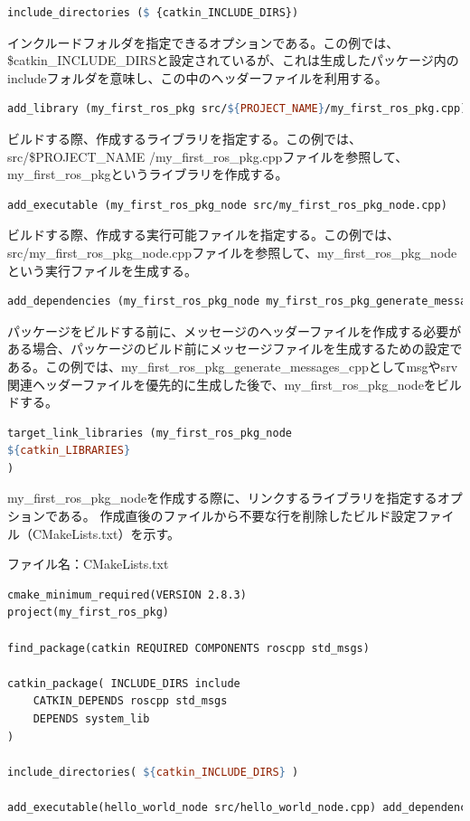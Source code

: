 \begin{lstlisting}[language=make]
include_directories ($ {catkin_INCLUDE_DIRS})
\end{lstlisting}

インクルードフォルダを指定できるオプションである。この例では、\${catkin\_INCLUDE\_DIRS}と設定されているが、これは生成したパッケージ内のincludeフォルダを意味し、この中のヘッダーファイルを利用する。

\begin{lstlisting}[language=make]
add_library (my_first_ros_pkg src/${PROJECT_NAME}/my_first_ros_pkg.cpp)
\end{lstlisting}

ビルドする際、作成するライブラリを指定する。この例では、src/\${PROJECT\_NAME} /my\_first\_ros\_pkg.cppファイルを参照して、my\_first\_ros\_pkgというライブラリを作成する。

\begin{lstlisting}[language=make]
add_executable (my_first_ros_pkg_node src/my_first_ros_pkg_node.cpp)
\end{lstlisting}

ビルドする際、作成する実行可能ファイルを指定する。この例では、src/my\_first\_ros\_pkg\_node.cppファイルを参照して、my\_first\_ros\_pkg\_nodeという実行ファイルを生成する。

\begin{lstlisting}[language=make]
add_dependencies (my_first_ros_pkg_node my_first_ros_pkg_generate_messages_cpp)
\end{lstlisting}

パッケージをビルドする前に、メッセージのヘッダーファイルを作成する必要がある場合、パッケージのビルド前にメッセージファイルを生成するための設定である。この例では、my\_first\_ros\_pkg\_generate\_messages\_cppとしてmsgやsrv関連ヘッダーファイルを優先的に生成した後で、my\_first\_ros\_pkg\_nodeをビルドする。

\begin{lstlisting}[language=make]
target_link_libraries (my_first_ros_pkg_node
${catkin_LIBRARIES}
)
\end{lstlisting}

my\_first\_ros\_pkg\_nodeを作成する際に、リンクするライブラリを指定するオプションである。
作成直後のファイルから不要な行を削除したビルド設定ファイル（CMakeLists.txt）を示す。

ファイル名：CMakeLists.txt
\begin{lstlisting}[language=make]
cmake_minimum_required(VERSION 2.8.3)
project(my_first_ros_pkg)

find_package(catkin REQUIRED COMPONENTS roscpp std_msgs)

catkin_package( INCLUDE_DIRS include
    CATKIN_DEPENDS roscpp std_msgs
    DEPENDS system_lib
)

include_directories( ${catkin_INCLUDE_DIRS} )

add_executable(hello_world_node src/hello_world_node.cpp) add_dependencies(hello_world_node my_first_ros_pkg_generate_messages_cpp) target_link_libraries(hello_world_node ${catkin_LIBRARIES})
\end{lstlisting}

